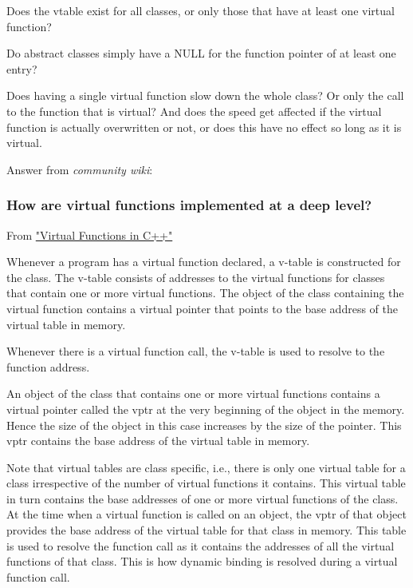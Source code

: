 \documentclass[10pt]{amsart}
\begin{document}
Does the vtable exist for all classes, or only those that have at least one virtual function?

Do abstract classes simply have a NULL for the function pointer of at least one entry?

Does having a single virtual function slow down the whole class? Or only the call to the function that is virtual? And does the speed get affected if the virtual function is actually overwritten or not, or does this have no effect so long as it is virtual.

Answer from \emph{community wiki}:  

\subsubsection{How are virtual functions implemented at a deep level?}

From \href{http://wayback.archive.org/web/20100209040010/http://www.codersource.net/published/view/325/virtual_functions_in.aspx}{"Virtual Functions in C++"}

Whenever a program has a virtual function declared, a v-table is constructed for the class. The v-table consists of addresses to the virtual functions for classes that contain one or more virtual functions. The object of the class containing the virtual function contains a virtual pointer that points to the base address of the virtual table in memory.   

Whenever there is a virtual function call, the v-table is used to resolve to the function address. 

An object of the class that contains one or more virtual functions contains a virtual pointer called the vptr at the very beginning of the object in the memory. Hence the size of the object in this case increases by the size of the pointer. This vptr contains the base address of the virtual table in memory.  

Note that virtual tables are class specific, i.e., there is only one virtual table for a class irrespective of the number of virtual functions it contains. This virtual table in turn contains the base addresses of one or more virtual functions of the class. At the time when a virtual function is called on an object, the vptr of that object provides the base address of the virtual table for that class in memory. This table is used to resolve the function call as it contains the addresses of all the virtual functions of that class. This is how dynamic binding is resolved during a virtual function call.
\end{document}
